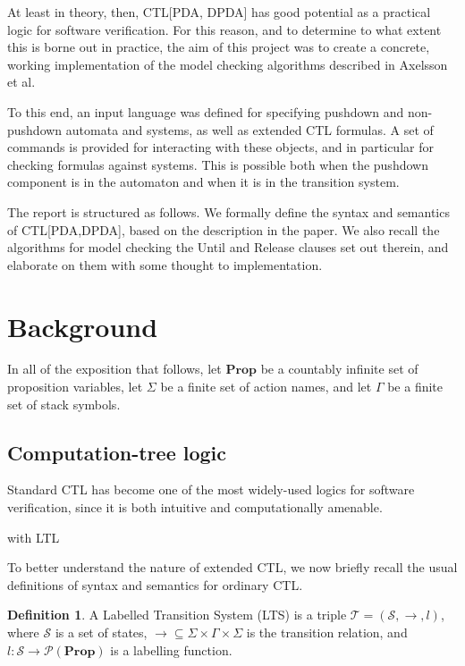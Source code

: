 \documentclass[11pt]{article}
\theoremstyle{definition}
\newtheorem{mydef}{Definition}
\begin{document}
At least in theory, then, CTL[PDA, DPDA] has good potential as a practical
logic for software verification. For this reason, and to determine to what
extent this is borne out in practice, the aim of this project was to create a
concrete, working implementation of the model checking algorithms described in
Axelsson et al.


To this end, an input language was defined for specifying pushdown and
non-pushdown automata and systems, as well as extended CTL formulas.  A set of
commands is provided for interacting with these objects, and in particular for
checking formulas against systems.  This is possible both when the pushdown
component is in the automaton and when it is in the transition system.



The report is structured as follows. We formally define the syntax and
semantics of CTL[PDA,DPDA], based on the description in the paper. We also
recall the algorithms for model checking the Until and Release clauses set out
therein, and elaborate on them with some thought to implementation.

\section{Background}

In all of the exposition that follows, let $\textbf{Prop}$ be a countably
infinite set of proposition variables, let $\Sigma$ be a finite set of action
names, and let $\Gamma$ be a finite set of stack symbols.

\subsection{Computation-tree logic}

Standard CTL has become %
one of the most widely-used logics for software verification, since it is both
intuitive and computationally amenable.

with LTL

To better understand the nature of extended CTL, we now briefly recall the
usual definitions of syntax and semantics for ordinary CTL.

\begin{mydef}
A Labelled Transition System (LTS) is a triple $\mathcal{T} = (\mathcal{S}, \rightarrow, l)$,
where $\mathcal{S}$ is a set of states, $\rightarrow \subseteq \Sigma \times
\Gamma \times \Sigma$ is the transition relation, and $l:\mathcal{S}
\rightarrow \mathcal{P}(\textbf{Prop})$ is a labelling function.
\end{mydef}
\end{document}
